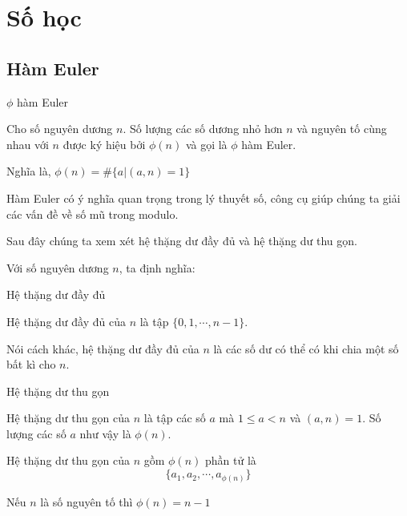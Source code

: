 \chapter{Số học}

\section{Hàm Euler}

\begin{defblock}{$\phi$ hàm Euler}
    
    Cho số nguyên dương $n$. Số lượng các số dương nhỏ hơn $n$ và nguyên tố cùng nhau với $n$ được ký hiệu bởi $\phi(n)$ và gọi là $\phi$ hàm Euler.

    Nghĩa là, $\phi(n) = \# \{ a | (a, n) = 1\}$
\end{defblock}

Hàm Euler có ý nghĩa quan trọng trong lý thuyết số, công cụ giúp chúng ta giải các vấn đề về số mũ trong modulo.

Sau đây chúng ta xem xét hệ thặng dư đầy đủ và hệ thặng dư thu gọn.

Với số nguyên dương $n$, ta định nghĩa:

\begin{defblock}{Hệ thặng dư đầy đủ}

    \begin{definition}
        Hệ thặng dư đầy đủ của $n$ là tập $\{0, 1, \cdots, n-1\}$.
    \end{definition}
\end{defblock}

Nói cách khác, hệ thặng dư đầy đủ của $n$ là các số dư có thể có khi chia một số bất kì cho $n$.

\begin{defblock}{Hệ thặng dư thu gọn}

    \begin{definition}
        Hệ thặng dư thu gọn của $n$ là tập các số $a$ mà $1 \leq a < n$ và $(a, n) = 1$. Số lượng các số $a$ như vậy là $\phi (n)$.  
    \end{definition}

\end{defblock}

\begin{remark}
    Hệ thặng dư thu gọn của $n$ gồm $\phi(n)$ phần tử là $$\{a_1, a_2, \cdots, a_{\phi(n)}\}$$
\end{remark}

\begin{remark}
    Nếu $n$ là số nguyên tố thì $\phi(n) = n-1$
\end{remark}

